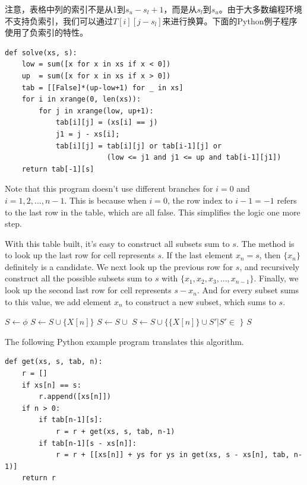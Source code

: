 \documentclass[UTF8]{article}
\begin{document}
注意，表格中列的索引不是从1到$s_u-s_l + 1$，而是从$s_l$到$s_u$。由于大多数编程环境不支持负索引，我们可以通过$T[i][j-s_l]$来进行换算。下面的Python例子程序使用了负索引的特性。

\lstset{language=Python}
\begin{lstlisting}
def solve(xs, s):
    low = sum([x for x in xs if x < 0])
    up  = sum([x for x in xs if x > 0])
    tab = [[False]*(up-low+1) for _ in xs]
    for i in xrange(0, len(xs)):
        for j in xrange(low, up+1):
            tab[i][j] = (xs[i] == j)
            j1 = j - xs[i];
            tab[i][j] = tab[i][j] or tab[i-1][j] or
                        (low <= j1 and j1 <= up and tab[i-1][j1])
    return tab[-1][s]
\end{lstlisting}

Note that this program doesn't use different branches for $i = 0$ and $i = 1, 2, ..., n-1$. This
is because when $i = 0$, the row index to $i - 1 = -1$ refers to the last row in the table, which are
all false. This simplifies the logic one more step.

With this table built, it's easy to construct all subsets sum to $s$. The method is to look up
the last row for cell represents $s$. If the last element $x_n = s$, then $\{x_n\}$ definitely
is a candidate. We next look up the previous row for $s$, and recursively construct all the
possible subsets sum to $s$ with $\{x_1, x_2, x_3, ..., x_{n-1}\}$. Finally, we look up
the second last row for cell represents $s - x_n$. And for every subset sums to this value,
we add element $x_n$ to construct a new subset, which sums to $s$.

\begin{algorithmic}[1]
  \State $S \gets \phi$
    \State $S \gets S \cup \{X[n]\}$
  \EndIf
      \State $S \gets S \cup $ 
    \EndIf
      \State $S \gets S \cup \{\{X[n]\} \cup S' | S' \in $  $\}$
    \EndIf
  \EndIf
  \State \Return $S$
\EndFunction
\end{algorithmic}

The following Python example program translates this algorithm.

\lstset{language=Python}
\begin{lstlisting}
def get(xs, s, tab, n):
    r = []
    if xs[n] == s:
        r.append([xs[n]])
    if n > 0:
        if tab[n-1][s]:
            r = r + get(xs, s, tab, n-1)
        if tab[n-1][s - xs[n]]:
            r = r + [[xs[n]] + ys for ys in get(xs, s - xs[n], tab, n-1)]
    return r
\end{lstlisting}
\end{document}
